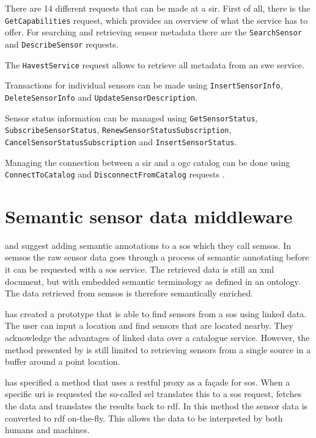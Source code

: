 \begin{sloppypar}
There are 14 different requests that can be made at a \ac{sir}. First of all, there is the \texttt{GetCapabilities} request, which provides an overview of what the service has to offer. For searching and retrieving sensor metadata there are the \texttt{SearchSensor} and \texttt{DescribeSensor} requests. 

The \texttt{HavestService} request allows to retrieve all metadata from an \ac{swe} service. 

Transactions for individual sensors can be made using \texttt{InsertSensorInfo}, \texttt{DeleteSensorInfo}  and \texttt{UpdateSensorDescription}. 

Sensor status information can be managed using \texttt{GetSensorStatus}, \texttt{SubscribeSensorStatus}, \texttt{RenewSensorStatusSubscription}, \texttt{CancelSensorStatusSubscription} and \texttt{InsertSensorStatus}. 

Managing the connection between a \ac{sir} and a \ac{ogc} catalog can be done using \texttt{ConnectToCatalog} and \texttt{DisconnectFromCatalog} requests \citep{SW:OGC3}.
\end{sloppypar}

\section{Semantic sensor data middleware}
\cite{SSW:Henson} and \cite{SSW:Pschorr} suggest adding semantic annotations to a \ac{sos} which they call \ac{semsos}. In \ac{semsos} the raw sensor data goes through a process of semantic annotating before it can be requested with a \ac{sos} service. The retrieved data is still an \ac{xml} document, but with embedded semantic terminology as defined in an ontology. The data retrieved from \ac{semsos} is therefore semantically enriched.  

\cite{SSW:Pschorr2} has created a prototype that is able to find sensors from a \ac{sos} using linked data. The user can input a location and find sensors that are located nearby. They acknowledge the advantages of linked data over a catalogue service. However, the method presented by \cite{SSW:Pschorr2} is still limited to retrieving sensors from a single source in a buffer around a point location.  

\cite{SSW:Janowicz} has specified a method that uses a \ac{rest}ful proxy as a fa\c{c}ade for \ac{sos}. When a specific \ac{uri} is requested the so-called \ac{sel} translates this to a \ac{sos} request, fetches the data and translates the results back to \ac{rdf}. In this method the sensor data is converted to \ac{rdf} on-the-fly. This allows the data to be interpreted by both humans and machines.  

